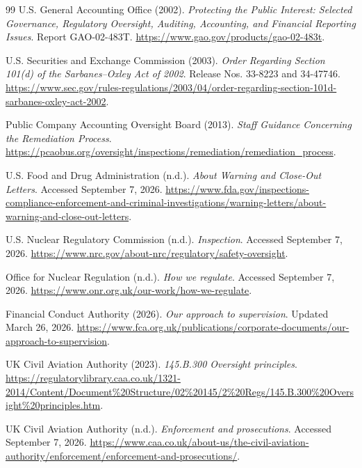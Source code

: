 \documentclass{article}
\begin{document}
\begin{thebibliography}{99}
U.S. General Accounting Office (2002).
\emph{Protecting the Public Interest: Selected Governance, Regulatory Oversight, Auditing, Accounting, and Financial Reporting Issues}.
Report GAO-02-483T.
\url{https://www.gao.gov/products/gao-02-483t}.

U.S. Securities and Exchange Commission (2003).
\emph{Order Regarding Section 101(d) of the Sarbanes--Oxley Act of 2002}.
Release Nos. 33-8223 and 34-47746.
\url{https://www.sec.gov/rules-regulations/2003/04/order-regarding-section-101d-sarbanes-oxley-act-2002}.

Public Company Accounting Oversight Board (2013).
\emph{Staff Guidance Concerning the Remediation Process}.
\url{https://pcaobus.org/oversight/inspections/remediation/remediation_process}.

U.S. Food and Drug Administration (n.d.).
\emph{About Warning and Close-Out Letters}.
Accessed September 7, 2026.
\url{https://www.fda.gov/inspections-compliance-enforcement-and-criminal-investigations/warning-letters/about-warning-and-close-out-letters}.

U.S. Nuclear Regulatory Commission (n.d.).
\emph{Inspection}.
Accessed September 7, 2026.
\url{https://www.nrc.gov/about-nrc/regulatory/safety-oversight}.

Office for Nuclear Regulation (n.d.).
\emph{How we regulate}.
Accessed September 7, 2026.
\url{https://www.onr.org.uk/our-work/how-we-regulate}.

Financial Conduct Authority (2026).
\emph{Our approach to supervision}.
Updated March 26, 2026.
\url{https://www.fca.org.uk/publications/corporate-documents/our-approach-to-supervision}.

UK Civil Aviation Authority (2023).
\emph{145.B.300 Oversight principles}.
\url{https://regulatorylibrary.caa.co.uk/1321-2014/Content/Document%20Structure/02%20145/2%20Regs/145.B.300%20Oversight%20principles.htm}.

UK Civil Aviation Authority (n.d.).
\emph{Enforcement and prosecutions}.
Accessed September 7, 2026.
\url{https://www.caa.co.uk/about-us/the-civil-aviation-authority/enforcement/enforcement-and-prosecutions/}.


\end{thebibliography}
\end{document}
